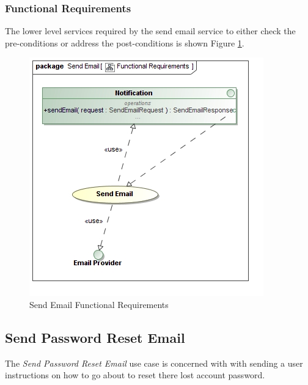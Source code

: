 \subsubsection{Functional Requirements}
The lower level services required by the send email service to either
check the pre-conditions or address the post-conditions is shown 
Figure \ref{fig:sendEmailFunctionalRequirements}.
\begin{figure}[H]
	\begin{center}
		\includegraphics[scale=0.38]{../Diagrams and Charts/Notifications/Send Email Functional Requirements.jpg}
		\caption{Send Email Functional Requirements}
		\label{fig:sendEmailFunctionalRequirements}
	\end{center}	
\end{figure}



\subsection{Send Password Reset Email}
The \textit{Send Password Reset Email} use case is concerned with with sending
a user instructions on how to go about to reset there lost account password.

